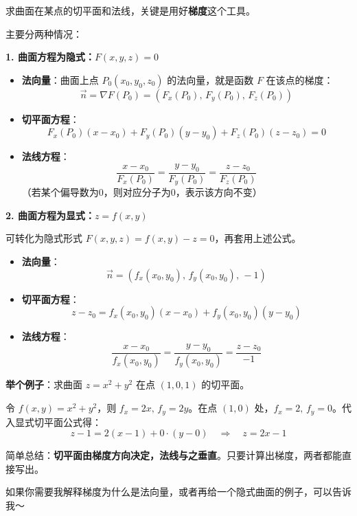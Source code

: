求曲面在某点的切平面和法线，关键是用好\textbf{梯度}这个工具。

主要分两种情况：

\textbf{1. 曲面方程为隐式：\(F(x,y,z)=0\)}

\begin{itemize}
\item
  \textbf{法向量}：曲面上点 \(P_0(x_0,y_0,z_0)\) 的法向量，就是函数
  \(F\) 在该点的梯度： \[
  \vec{n} = \nabla F(P_0) = \left( F_x(P_0),\, F_y(P_0),\, F_z(P_0) \right)
  \]
\item
  \textbf{切平面方程}： \[
  F_x(P_0)(x-x_0) + F_y(P_0)(y-y_0) + F_z(P_0)(z-z_0) = 0
  \]
\item
  \textbf{法线方程}： \[
  \frac{x-x_0}{F_x(P_0)} = \frac{y-y_0}{F_y(P_0)} = \frac{z-z_0}{F_z(P_0)}
  \] （若某个偏导数为0，则对应分子为0，表示该方向不变）
\end{itemize}

\textbf{2. 曲面方程为显式：\(z = f(x,y)\)}

可转化为隐式形式 \(F(x,y,z)=f(x,y)-z=0\)，再套用上述公式。

\begin{itemize}
\item
  \textbf{法向量}： \[
  \vec{n} = \left( f_x(x_0,y_0),\, f_y(x_0,y_0),\, -1 \right)
  \]
\item
  \textbf{切平面方程}： \[
  z - z_0 = f_x(x_0,y_0)(x-x_0) + f_y(x_0,y_0)(y-y_0)
  \]
\item
  \textbf{法线方程}： \[
  \frac{x-x_0}{f_x(x_0,y_0)} = \frac{y-y_0}{f_y(x_0,y_0)} = \frac{z-z_0}{-1}
  \]
\end{itemize}

\textbf{举个例子}：求曲面 \(z = x^2 + y^2\) 在点 \((1,0,1)\) 的切平面。

令 \(f(x,y)=x^2+y^2\)，则 \(f_x=2x,\, f_y=2y\)。在点 \((1,0)\)
处，\(f_x=2,\, f_y=0\)。代入显式切平面公式得： \[
z - 1 = 2(x-1) + 0 \cdot (y-0) \quad \Rightarrow \quad z = 2x - 1
\]

简单总结：\textbf{切平面由梯度方向决定，法线与之垂直}。只要计算出梯度，两者都能直接写出。

如果你需要我解释梯度为什么是法向量，或者再给一个隐式曲面的例子，可以告诉我～
